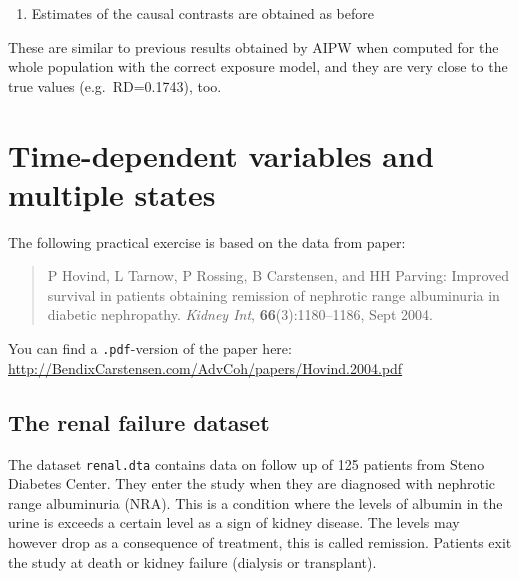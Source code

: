 \documentclass[
]{book}
\newenvironment{Shaded}{\begin{snugshade}}{\end{snugshade}}
\newcommand{\DecValTok}[1]{\textcolor[rgb]{0.00,0.00,0.81}{#1}}
\newcommand{\FunctionTok}[1]{\textcolor[rgb]{0.13,0.29,0.53}{\textbf{#1}}}
\newcommand{\NormalTok}[1]{#1}
\newcommand{\OtherTok}[1]{\textcolor[rgb]{0.56,0.35,0.01}{#1}}
\newcommand{\SpecialCharTok}[1]{\textcolor[rgb]{0.81,0.36,0.00}{\textbf{#1}}}
\providecommand{\tightlist}{%
  \setlength{\itemsep}{0pt}\setlength{\parskip}{0pt}}
\begin{document}
\begin{enumerate}
\def\labelenumi{\arabic{enumi}.}
\setcounter{enumi}{3}
\tightlist
\item
  Estimates of the causal contrasts are obtained as before
\end{enumerate}

\begin{Shaded}
\end{Shaded}

These are similar to previous results obtained by AIPW when computed for
the whole population with the correct exposure model, and they are very
close to the true values (e.g.~RD=0.1743), too.

\chapter{Time-dependent variables and multiple states}\label{time-dependent-variables-and-multiple-states}

The following practical exercise is based on the data from paper:

\begin{quote}
P Hovind, L Tarnow, P Rossing, B Carstensen, and HH Parving:
Improved survival in patients obtaining remission of nephrotic range
albuminuria in diabetic nephropathy.
\emph{Kidney Int}, \textbf{66}(3):1180--1186, Sept 2004.
\end{quote}

You can find a \texttt{.pdf}-version of the paper here:
\url{http://BendixCarstensen.com/AdvCoh/papers/Hovind.2004.pdf}

\section{The renal failure dataset}\label{the-renal-failure-dataset}

The dataset \texttt{renal.dta} contains data on follow up of 125
patients from Steno Diabetes Center. They enter the study when they
are diagnosed with nephrotic range albuminuria (NRA). This is a
condition where the levels of albumin in the urine is exceeds a
certain level as a sign of kidney disease. The levels may however drop
as a consequence of treatment, this is called remission. Patients exit
the study at death or kidney failure (dialysis or transplant).
\end{document}
